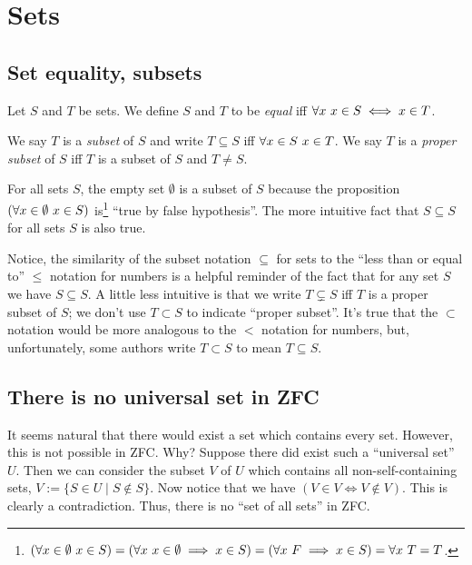 \newpage

\section{Sets}

\subsection*{Set equality, subsets}

Let $S$ and $T$ be sets. We define $S$ and $T$ to be \textit{equal} iff $\forall x \text{ } x \in S \iff x \in T$.

We say $T$ is a \textit{subset} of $S$ and write $T \subseteq S$ iff $\forall x \in S \text{ } x \in T$. We say $T$ is a \textit{proper subset} of $S$ iff $T$ is a subset of $S$ and $T \neq S$.

For all sets $S$, the empty set $\emptyset$ is a subset of $S$ because the proposition $(\forall x \in \emptyset \text{ } x \in S)$ is\footnote{$(\forall x \in \emptyset \text{ } x \in S) = (\forall x \text{ } x \in \emptyset \implies x \in S) = (\forall x \text{ } F \implies x \in S) = \forall x \text{ } T = T$.} ``true by false hypothesis''. The more intuitive fact that $S \subseteq S$ for all sets $S$ is also true.

Notice, the similarity of the subset notation $\subseteq$ for sets to the ``less than or equal to'' $\leq$ notation for numbers is a helpful reminder of the fact that for any set $S$ we have $S \subseteq S$. A little less intuitive is that we write $T \subsetneq S$ iff $T$ is a proper subset of $S$; we don't use $T \subset S$ to indicate ``proper subset''. It's true that the $\subset$ notation would be more analogous to the $<$ notation for numbers, but, unfortunately, some authors write $T \subset S$ to mean $T \subseteq S$.

\subsection*{There is no universal set in ZFC}

It seems natural that there would exist a set which contains every set. However, this is not possible in ZFC. Why? Suppose there did exist such a ``universal set'' $U$. Then we can consider the subset $V$ of $U$ which contains all non-self-containing sets, $V := \{ S \in U \mid S \notin S \}$. Now notice that we have $(V \in V \iff V \notin V)$. This is clearly a contradiction. Thus, there is no ``set of all sets'' in ZFC.

